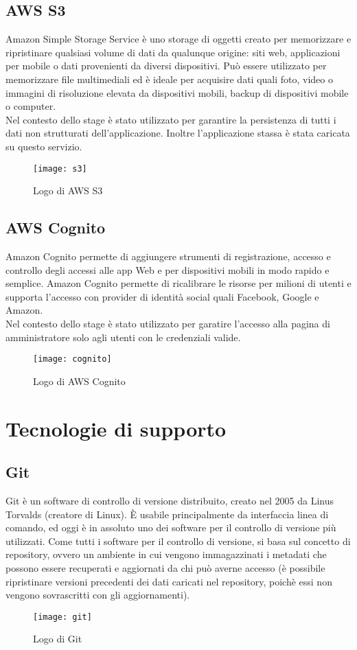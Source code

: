 \subsection{AWS S3} 
Amazon Simple Storage Service è uno storage di
oggetti creato per memorizzare e ripristinare qualsiasi volume di dati da qualunque
origine: siti web, applicazioni per mobile o dati provenienti da diversi dispositivi. Può
essere utilizzato per memorizzare file multimediali ed è ideale per acquisire dati quali
foto, video o immagini di risoluzione elevata da dispositivi mobili, backup di dispositivi
mobile o computer.
\\

Nel contesto dello stage è stato utilizzato per garantire la persistenza di tutti i dati
non strutturati dell’applicazione. Inoltre l'applicazione stassa è stata caricata su questo servizio.   
\begin{figure}[!h] 
	\centering 
	\texttt{[image: s3]}
	\caption{Logo di AWS S3}
\end{figure}

\subsection{AWS Cognito} 
Amazon Cognito permette di aggiungere strumenti di registrazione, accesso e controllo degli accessi alle app Web e per dispositivi mobili in modo rapido e semplice. Amazon Cognito permette di ricalibrare le risorse per milioni di utenti e supporta l'accesso con provider di identità social quali Facebook, Google e Amazon. 
\\

Nel contesto dello stage è stato utilizzato per garatire l'accesso alla pagina di amministratore solo agli utenti con le credenziali valide.   
\begin{figure}[!h] 
	\centering 
	\texttt{[image: cognito]}
	\caption{Logo di AWS Cognito}
\end{figure}\newpage
\section{Tecnologie di supporto}
\subsection{Git}
Git è un software di controllo di versione distribuito, creato nel 2005 da Linus
Torvalds (creatore di Linux). È usabile principalmente da interfaccia linea di comando,
ed oggi è in assoluto uno dei software per il controllo di versione più utilizzati. Come
tutti i software per il controllo di versione, si basa sul concetto di repository, ovvero
un ambiente in cui vengono immagazzinati i metadati che possono essere recuperati e
aggiornati da chi può averne accesso (è possibile ripristinare versioni precedenti dei
dati caricati nel repository, poichè essi non vengono sovrascritti con gli aggiornamenti).
\begin{figure}[!h] 
	\centering 
	\texttt{[image: git]}
	\caption{Logo di Git}
\end{figure}

